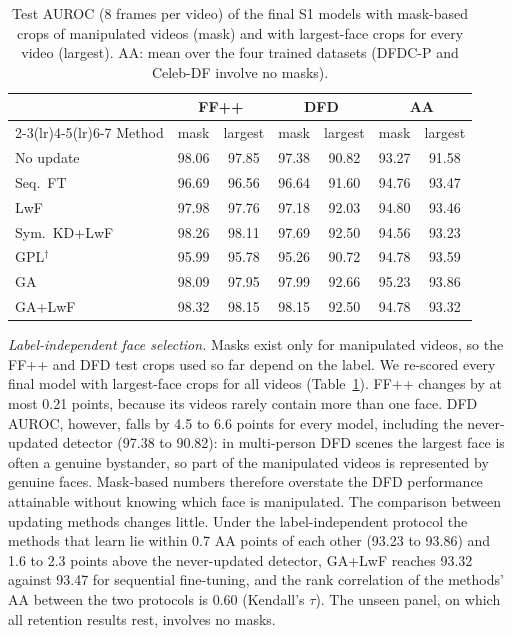 \documentclass{ieeeaccess}
\newcommand{\ffpp}{FF{+}{+}}
\begin{document}
\begin{table}[t]
\caption{Test AUROC (8 frames per video) of the final S1 models with mask-based crops of manipulated videos (mask) and with largest-face crops for every video (largest). AA: mean over the four trained datasets (DFDC-P and Celeb-DF involve no masks).}
\label{tab:labelindep}
\centering
\footnotesize
\setlength{\tabcolsep}{2.6pt}
\begin{tabular}{@{}lcccccc@{}}
\toprule
& \multicolumn{2}{c}{\ffpp{}} & \multicolumn{2}{c}{DFD} & \multicolumn{2}{c}{AA} \\
\cmidrule(lr){2-3}\cmidrule(lr){4-5}\cmidrule(lr){6-7}
Method & mask & largest & mask & largest & mask & largest \\
\midrule
No update & 98.06 & 97.85 & 97.38 & 90.82 & 93.27 & 91.58 \\
Seq.\ FT & 96.69 & 96.56 & 96.64 & 91.60 & 94.76 & 93.47 \\
LwF & 97.98 & 97.76 & 97.18 & 92.03 & 94.80 & 93.46 \\
Sym.\ KD+LwF & 98.26 & 98.11 & 97.69 & 92.50 & 94.56 & 93.23 \\
GPL$^\dagger$ & 95.99 & 95.78 & 95.26 & 90.72 & 94.78 & 93.59 \\
GA & 98.09 & 97.95 & 97.99 & 92.66 & 95.23 & 93.86 \\
GA+LwF & 98.32 & 98.15 & 98.15 & 92.50 & 94.78 & 93.32 \\
\bottomrule
\end{tabular}
\end{table}

\textit{Label-independent face selection.}\label{sec:labelindep} Masks exist only for manipulated videos, so the \ffpp{} and DFD test crops used so far depend on the label. We re-scored every final model with largest-face crops for all videos (Table~\ref{tab:labelindep}). \ffpp{} changes by at most 0.21 points, because its videos rarely contain more than one face. DFD AUROC, however, falls by 4.5 to 6.6 points for every model, including the never-updated detector (97.38 to 90.82): in multi-person DFD scenes the largest face is often a genuine bystander, so part of the manipulated videos is represented by genuine faces. Mask-based numbers therefore overstate the DFD performance attainable without knowing which face is manipulated. The comparison between updating methods changes little. Under the label-independent protocol the methods that learn lie within 0.7 AA points of each other (93.23 to 93.86) and 1.6 to 2.3 points above the never-updated detector, GA+LwF reaches 93.32 against 93.47 for sequential fine-tuning, and the rank correlation of the methods' AA between the two protocols is 0.60 (Kendall's $\tau$). The unseen panel, on which all retention results rest, involves no masks.
\end{document}
